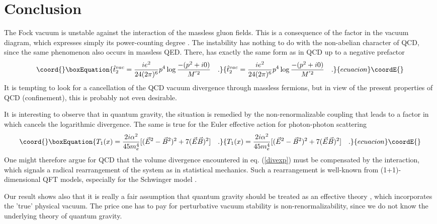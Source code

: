 \documentclass[a4paper,11pt]{article}
\begin{document}
\section{Conclusion}
The Fock vacuum is unstable against the interaction
of the massless gluon fields. This is a consequence of the factor
\coordHE{} in the vacuum diagram, which expresses simply its
power-counting degree \coordHE{}. 
The instability has nothing to do with the non-abelian character
of QCD, since the same phenomenon also occurs in massless
QED. There, \coordHE{} has exactly the same form as in QCD
up to a negative prefactor
\begin{equation}\coord{}\boxEquation{
\hat{t}_2^{vac}=\frac{ie^2}{24 (2 \pi)^6} p^4 \log \frac{-(p^2+i0)}{M^{'2}}
\quad .
}{
\hat{t}_2^{vac}=\frac{ie^2}{24 (2 \pi)^6} p^4 \log \frac{-(p^2+i0)}{M^{'2}}
\quad .
}{ecuacion}\coordE{}\end{equation}
It is tempting to look for a cancellation of the QCD vacuum divergence
through massless fermions, but in view of the present properties of QCD
(confinement), this is probably not even desirable.

It is interesting to observe
that in quantum gravity, the situation is remedied by
the non-renormalizable coupling that leads to a factor \coordHE{}
in \coordHE{} which cancels
the logarithmic divergence. The same is true for the Euler effective
action for photon-photon scattering
\begin{equation}\coord{}\boxEquation{
T_1(x)=\frac{2i\alpha^2}{45m_e^4}[(\vec{E}^2-\vec{B}^2)^2+7(\vec{E}
\vec{B})^2] \quad .
}{
T_1(x)=\frac{2i\alpha^2}{45m_e^4}[(\vec{E}^2-\vec{B}^2)^2+7(\vec{E}
\vec{B})^2] \quad .
}{ecuacion}\coordE{}\end{equation}
One might therefore argue for QCD that the volume divergence encountered in
eq. (\ref{divexp})
must be compensated by the interaction, which signals a radical rearrangement
of the system as in statistical mechanics. Such a rearrangement is
well-known from (1+1)-dimensional QFT models, especially for the
Schwinger model \cite{schw1,schw2,schw3}.

Our result shows also that it is really a fair
assumption that quantum gravity should be treated as
an effective theory \cite{donoghue}, which incorporates the 'true'
physical vacuum. The price one has to pay for perturbative vacuum stability
is non-renormalizability,
since we do not know the underlying theory of quantum gravity.
\end{document}
